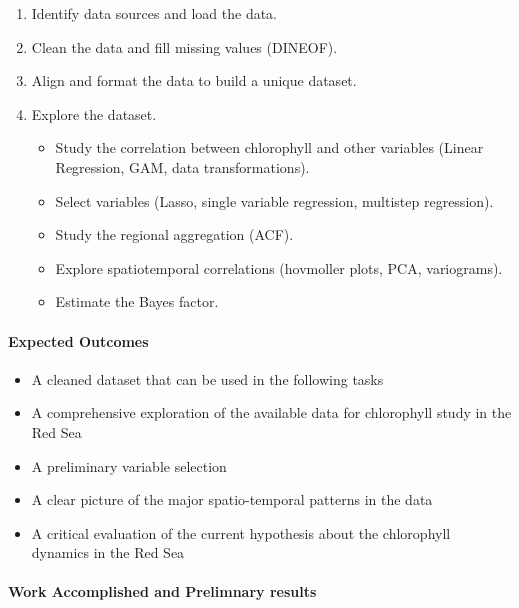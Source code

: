 \begin{enumerate}
  \item Identify data sources and load the data.
  \item Clean the data and fill missing values (DINEOF).
  \item Align and format the data to build a unique dataset.
  \item Explore the dataset.
  \begin{itemize}
    \item Study the correlation between chlorophyll and other variables (Linear Regression, GAM, data transformations).
    \item Select variables (Lasso, single variable regression, multistep regression).
    \item Study the regional aggregation (ACF).
    \item Explore spatiotemporal correlations (hovmoller plots, PCA, variograms).
    \item Estimate the Bayes factor.
  \end{itemize}
\end{enumerate}

\paragraph{Expected Outcomes}

\begin{itemize}
  \item A cleaned dataset that can be used in the following tasks
  \item A comprehensive exploration of the available data for chlorophyll study in the Red Sea
  \item A preliminary variable selection
  \item A clear picture of the major spatio-temporal patterns in the data
  \item A critical evaluation of the current hypothesis about the chlorophyll dynamics in the Red Sea
\end{itemize}

\paragraph{Work Accomplished and Prelimnary results}
